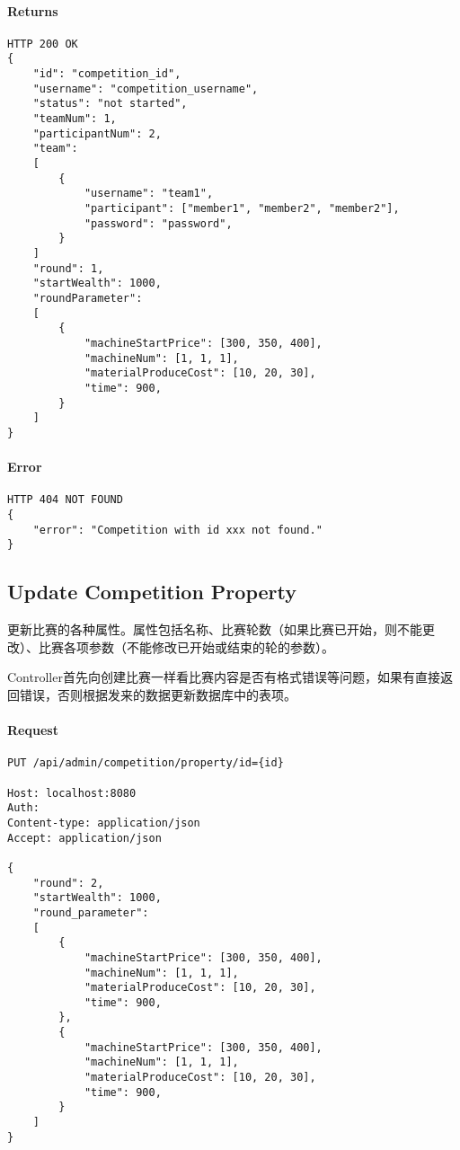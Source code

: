 \documentclass{article}
\begin{document}
\paragraph*{Returns}
\begin{lstlisting}
HTTP 200 OK
{
    "id": "competition_id",
    "username": "competition_username",
    "status": "not started",
    "teamNum": 1,
    "participantNum": 2,
    "team":
    [
        {
            "username": "team1",
            "participant": ["member1", "member2", "member2"],
            "password": "password",
        }
    ]
    "round": 1,
    "startWealth": 1000,
    "roundParameter":
    [
        {
            "machineStartPrice": [300, 350, 400],
            "machineNum": [1, 1, 1],
            "materialProduceCost": [10, 20, 30],
            "time": 900,
        }
    ]
}

\end{lstlisting}

\paragraph*{Error}
\begin{lstlisting}
HTTP 404 NOT FOUND
{
    "error": "Competition with id xxx not found."
}
\end{lstlisting}

\subsection{Update Competition Property}

更新比赛的各种属性。属性包括名称、比赛轮数（如果比赛已开始，则不能更改）、比赛各项参数（不能修改已开始或结束的轮的参数）。

Controller首先向创建比赛一样看比赛内容是否有格式错误等问题，如果有直接返回错误，否则根据发来的数据更新数据库中的表项。

\paragraph*{Request}
\begin{lstlisting}
PUT /api/admin/competition/property/id={id}

Host: localhost:8080
Auth:
Content-type: application/json
Accept: application/json

{
    "round": 2,
    "startWealth": 1000,
    "round_parameter":
    [
        {
            "machineStartPrice": [300, 350, 400],
            "machineNum": [1, 1, 1],
            "materialProduceCost": [10, 20, 30],
            "time": 900,
        },
        {
            "machineStartPrice": [300, 350, 400],
            "machineNum": [1, 1, 1],
            "materialProduceCost": [10, 20, 30],
            "time": 900,
        }
    ]
}
\end{lstlisting}
\end{document}
